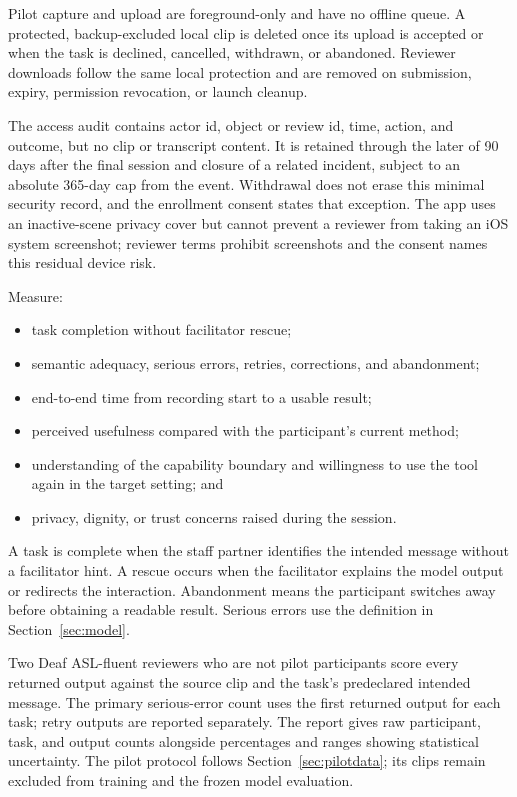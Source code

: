 \documentclass[11pt]{article}
\begin{document}
Pilot capture and upload are foreground-only and have no offline queue. A protected,
backup-excluded local clip is deleted once its upload is accepted or when the task is
declined, cancelled, withdrawn, or abandoned. Reviewer downloads follow the same
local protection and are removed on submission, expiry, permission revocation, or
launch cleanup.

The access audit contains actor id, object or review id, time, action, and outcome, but
no clip or transcript content. It is retained through the later of 90 days after the
final session and closure of a related incident, subject to an absolute 365-day cap
from the event. Withdrawal does not erase this minimal security record, and the
enrollment consent states that exception. The app
uses an inactive-scene privacy cover but cannot prevent a reviewer from taking an iOS
system screenshot; reviewer terms prohibit screenshots and the consent names this
residual device risk.

Measure:

\begin{itemize}[nosep]
  \item task completion without facilitator rescue;
  \item semantic adequacy, serious errors, retries, corrections, and abandonment;
  \item end-to-end time from recording start to a usable result;
  \item perceived usefulness compared with the participant's current method;
  \item understanding of the capability boundary and willingness to use the tool
        again in the target setting; and
  \item privacy, dignity, or trust concerns raised during the session.
\end{itemize}

A task is complete when the staff partner identifies the intended message without a
facilitator hint. A rescue occurs when the facilitator explains the model output or
redirects the interaction. Abandonment means the participant switches away before
obtaining a readable result. Serious errors use the definition in
Section~\ref{sec:model}.

Two Deaf ASL-fluent reviewers who are not pilot participants score every returned
output against the source clip and the task's predeclared intended message. The
primary serious-error count uses the first returned output for each task; retry
outputs are reported separately. The report gives raw participant, task, and output
counts alongside percentages and ranges showing statistical uncertainty. The pilot
protocol follows Section~\ref{sec:pilotdata}; its clips remain excluded from training
and the frozen model evaluation.
\end{document}
